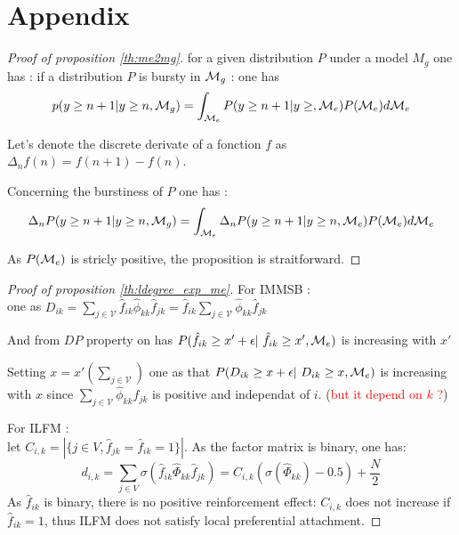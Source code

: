 \section{Appendix}

\begin{proof}[Proof of proposition \ref{th:me2mg}]
for a given distribution $P$ under a model $M_g$ one has : 
if a distribution $P$ is bursty in $\mathcal{M}_g$ : one has
\begin{equation*}
    p(y \geq n+1 | y \geq n, \mathcal{M}_g) = \int_{\mathcal{M}_e} P(y \geq n+1 | y \geq, \mathcal{M}_e) P(\mathcal{M}_e) d\mathcal{M}_e
\end{equation*}

Let's denote the discrete derivate of a fonction $f$  as $\Delta_n f(n) = f(n+1) -f(n)$.

Concerning the burstiness of $P$ one has : 
\begin{equation}
    \Delta_n P(y \geq n+1 | y \geq n, \mathcal{M}_g) = \int_{\mathcal{M}_e}\Delta_n P(y \geq n+1 | y \geq n, \mathcal{M}_e) P(\mathcal{M}_e)d\mathcal{M}_e
\end{equation}

As $P(\mathcal{M}_e)$ is stricly positive, the proposition is straitforward.
\end{proof}



\begin{proof}[Proof of proposition \ref{th:ldegree_exp_me}]
For IMMSB : ~\\

one as 
$D_{ik} = \sum_{j\in\mathcal{V}} \hat f_{ik} \hat \phi_{kk} \hat f_{jk} = \hat f_{ik} \sum_{j\in\mathcal{V}} \hat \phi_{kk} \hat f_{jk}$

And from $DP$ property on has
$P(\hat f_{ik} \geq x' + \epsilon | \hat f_{ik} \geq x', \M_e)$ is increasing with $x'$

Setting $x = x' (\sum_{j\in\mathcal{V}})$ one as that $P(D_{ik} \geq x + \epsilon | D_{ik} \geq x, \M_e)$ is increasing with $x$ since $\sum_{j\in \mathcal{V}} \hat \phi_{kk} \hat f_{jk}$ is positive and independat of $i$. (\textcolor{red}{but it depend on $k$ ?})


For ILFM :~\\

 let $C_{i,k} = |\{j \in V, \hat{f}_{jk} = \hat{f}_{ik} = 1\}|$. As the factor matrix is binary, one has:
%
\[ 
d_{i,k} = \sum_{j\in V} \sigma(\hat{f}_{ik} \hat{\Phi}_{kk} \hat{f}_{jk}) =  C_{i,k} (\sigma(\hat{\Phi}_{kk})-0.5) + \frac{N}{2}
\]
%
As $\hat{f}_{ik}$ is binary, there is no positive reinforcement effect: $C_{i,k}$ does not increase if $\hat{f}_{ik}=1$, thus ILFM does not satisfy local preferential attachment.
\end{proof}



